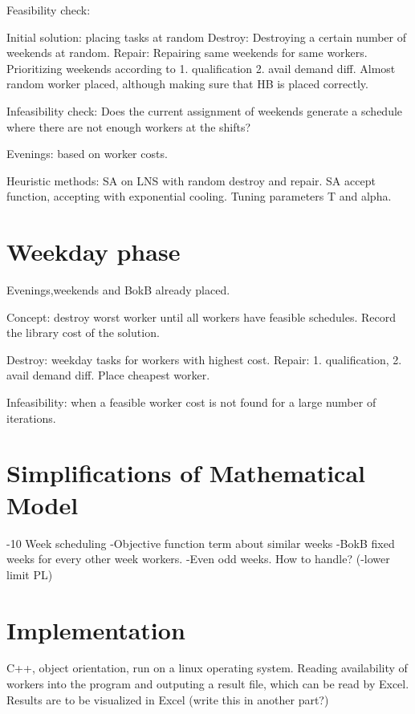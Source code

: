 Feasibility check: 

Initial solution: placing tasks at random
Destroy: Destroying a certain number of weekends at random.
Repair: Repairing same weekends for same workers. Prioritizing weekends according to 1. qualification 2. avail demand diff. Almost random worker placed, although making sure that HB is placed correctly.

Infeasibility check: Does the current assignment of weekends generate a schedule where there are not enough workers at the shifts?

Evenings: based on worker costs.

Heuristic methods: SA on LNS with random destroy and repair. SA accept function, accepting with exponential cooling. Tuning parameters T and alpha.

\section{Weekday phase}
Evenings,weekends and BokB already placed. 

Concept: destroy worst worker until all workers have feasible schedules. Record the library cost of the solution. 

Destroy: weekday tasks for workers with highest cost.
Repair: 1. qualification, 2. avail demand diff. Place cheapest worker.

Infeasibility: when a feasible worker cost is not found for a large number of iterations. 

\section{Simplifications of Mathematical Model}
-10 Week scheduling
-Objective function term about similar weeks
-BokB fixed weeks for every other week workers.
-Even odd weeks. How to handle?
(-lower limit PL)

\section{Implementation}
C++, object orientation, run on a linux operating system. Reading availability of workers into the program and outputing a result file, which can be read by Excel. Results are to be visualized in Excel (write this in another part?)
